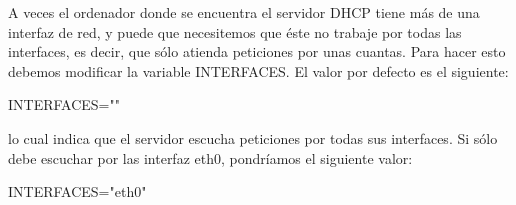 A veces el ordenador donde se encuentra el servidor DHCP tiene más de una interfaz de red, y puede que necesitemos que éste no trabaje por todas las interfaces, es decir, que sólo atienda peticiones por unas cuantas. Para hacer esto debemos modificar la variable INTERFACES. El valor por defecto es el siguiente:

	\begin{listing}[style=texto, numbers=none]
	INTERFACES=""
 	\end{listing}

lo cual indica que el servidor escucha peticiones por todas sus interfaces. Si sólo debe escuchar por las interfaz eth0, pondríamos el siguiente valor:
	\begin{listing}[style=texto, numbers=none]
	INTERFACES="eth0"
 	\end{listing}
 	
 	






	
